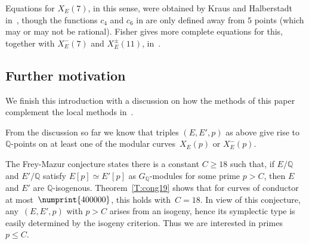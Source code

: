 \documentclass[12pt, reqno]{amsart}
\newcommand{\Q}{\mathbb{Q}}
\numberwithin{equation}{section}
\theoremstyle{definition}
\theoremstyle{remark}
\begin{document}
Equations for $X_E(7)$, in this sense, were obtained by Kraus and
Halberstadt in~\cite{Halberstadt-Kraus-XE7}, though the functions
$c_4$ and $c_6$ in \cite{Halberstadt-Kraus-XE7} are only defined away
from $5$ points (which may or may not be rational). Fisher gives more
complete equations for this, together with $X_E^-(7)$ and
$X_E^{\pm}(11)$, in~\cite{Fisher}.



\subsection{Further motivation} \label{S:motivation}
We finish this introduction with a discussion on how the methods of
this paper complement the local methods in~\cite{FKSym}.

From the discussion so far we know that triples $(E,E',p)$ as above give rise to $\Q$-points on at least one of the modular curves~$X_E(p)$ or $X_E^-(p)$. 

The Frey-Mazur conjecture states there is a constant $C \geq 18$ such
that, if $E/\Q$ and $E'/\Q$ satisfy $E[p] \simeq E'[p]$ as
$G_\Q$-modules for some prime $p > C$, then $E$ and $E'$ are
$\Q$-isogenous. Theorem~\ref{T:cong19} shows that for curves of
conductor at most~$\numprint{400000}$, this holds with~$C=18$. In view
of this conjecture, any~$(E,E',p)$ with $p > C$ arises from an
isogeny, hence its symplectic type is easily determined by the isogeny
criterion. Thus we are interested in primes $p \leq C$.

\end{document}
